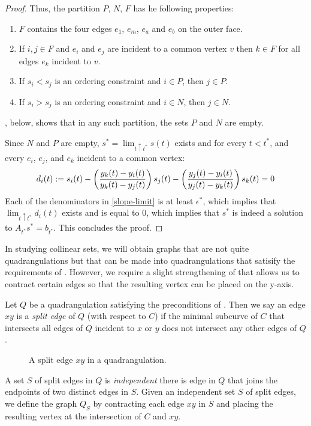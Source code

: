 \documentclass{patmorin}
\begin{document}
\begin{proof}
   Thus, the partition $P$, $N$, $F$ has he following properties:
   \begin{enumerate}
    \item $F$ contains the four edges $e_1$, $e_m$, $e_a$ and $e_b$
     on the outer face.
    \item If $i,j\in F$ and $e_i$ and $e_j$ are incident to a common
      vertex $v$ then $k\in F$ for all edges $e_k$ incident to $v$.
    \item If $s_i < s_j$ is an ordering constraint and $i\in P$,
      then $j\in P$.
    \item If $s_i > s_j$ is an ordering constraint and $i\in N$,
      then $j\in N$.
   \end{enumerate}
   , below, shows that in any such partition, the sets
   $P$ and $N$ are empty.

   Since $N$ and $P$ are empty, $s^*=\lim_{t\uparrow t^*} s(t)$ exists and 
   for every $t<t^*$,
   and every $e_i$, $e_j$, and $e_k$ incident to a common vertex:
   \begin{equation}
       d_i(t) := s_i(t) - \left(\frac{y_k(t)-y_i(t)}{y_k(t)-y_j(t)}\right) s_j(t) - \left(\frac{y_j(t)-y_i(t)}{y_j(t)-y_k(t)}\right)s_k(t) = 0 \eqlabel{slope-limit}
   \end{equation}
   Each of the denominators in \eqref{slope-limit} is at least
   $\epsilon^*$, which implies that $\lim_{t\uparrow t^*} d_i(t)$ exists
   and is equal to 0, which implies that $s^*$ is indeed a solution to
   $A_{t^*}s^*=b_{t^*}$.  This concludes the proof.
\end{proof}


In studying collinear sets, we will obtain graphs that are not quite
quadrangulations but that can be made into quadrangulations that
satisify the requirements of . However, we require a slight
strengthening of  that allows us to contract certain edges
so that the resulting vertex can be placed on the y-axis.

Let $Q$ be a quadrangulation satisfying the preconditions of
. Then we say an edge $xy$ is a \emph{split edge} of $Q$
(with respect to $C$) if the minimal subcurve of $C$ that intersects all
edges of $Q$ incident to $x$ or $y$ does not intersect any other edges
of $Q$.
\begin{figure}
   \caption{A split edge $xy$ in a quadrangulation.}
\end{figure}
A set $S$ of split edges in $Q$ is \emph{independent} there is edge in
$Q$ that joins the endpoints of two distinct edges in $S$.  Given an
independent set $S$ of split edges, we define the graph $Q_S$ by
contracting each edge $xy$ in $S$ and placing the resulting vertex at
the intersection of $C$ and $xy$.  
\end{document}
